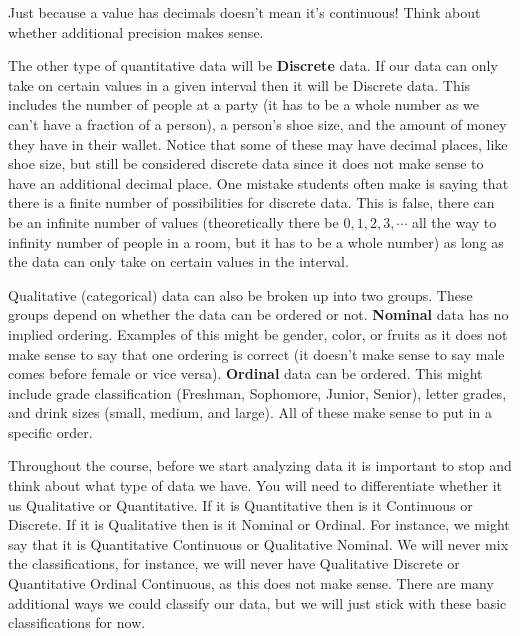 \documentclass[
  letterpaper,
  DIV=11,
  numbers=noendperiod]{scrreprt}
\begin{document}
\begin{tcolorbox}[enhanced jigsaw, colbacktitle=quarto-callout-warning-color!10!white, breakable, bottomrule=.15mm, colframe=quarto-callout-warning-color-frame, left=2mm, opacitybacktitle=0.6, title=\textcolor{quarto-callout-warning-color}{\faExclamationTriangle}\hspace{0.5em}{Warning}, leftrule=.75mm, opacityback=0, rightrule=.15mm, titlerule=0mm, bottomtitle=1mm, colback=white, toprule=.15mm, arc=.35mm, toptitle=1mm, coltitle=black]

Just because a value has decimals doesn't mean it's continuous! Think
about whether additional precision makes sense.

\end{tcolorbox}

The other type of quantitative data will be \textbf{Discrete} data. If
our data can only take on certain values in a given interval then it
will be Discrete data. This includes the number of people at a party (it
has to be a whole number as we can't have a fraction of a person), a
person's shoe size, and the amount of money they have in their wallet.
Notice that some of these may have decimal places, like shoe size, but
still be considered discrete data since it does not make sense to have
an additional decimal place. One mistake students often make is saying
that there is a finite number of possibilities for discrete data. This
is false, there can be an infinite number of values (theoretically there
be \(0, 1, 2, 3, \cdots\) all the way to infinity number of people in a
room, but it has to be a whole number) as long as the data can only take
on certain values in the interval.

Qualitative (categorical) data can also be broken up into two groups.
These groups depend on whether the data can be ordered or not.
\textbf{Nominal} data has no implied ordering. Examples of this might be
gender, color, or fruits as it does not make sense to say that one
ordering is correct (it doesn't make sense to say male comes before
female or vice versa). \textbf{Ordinal} data can be ordered. This might
include grade classification (Freshman, Sophomore, Junior, Senior),
letter grades, and drink sizes (small, medium, and large). All of these
make sense to put in a specific order.

Throughout the course, before we start analyzing data it is important to
stop and think about what type of data we have. You will need to
differentiate whether it us Qualitative or Quantitative. If it is
Quantitative then is it Continuous or Discrete. If it is Qualitative
then is it Nominal or Ordinal. For instance, we might say that it is
Quantitative Continuous or Qualitative Nominal. We will never mix the
classifications, for instance, we will never have Qualitative Discrete
or Quantitative Ordinal Continuous, as this does not make sense. There
are many additional ways we could classify our data, but we will just
stick with these basic classifications for now.
\end{document}

